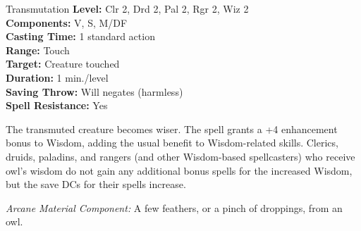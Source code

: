 {Transmutation}
{
	\textbf{Level:}
	Clr 2, Drd 2, Pal 2, Rgr 2, Wiz 2\\
	\textbf{Components:}
	V, S, M/DF\\
	\textbf{Casting Time:}
	1 standard action\\
	\textbf{Range:}
	Touch\\
	\textbf{Target:}
	Creature touched\\
	\textbf{Duration:}
	1 min./level\\
	\textbf{Saving Throw:}
	Will negates (harmless)\\
	\textbf{Spell Resistance:}
	Yes\\
}
{
	The transmuted creature becomes wiser. The spell grants a +4 enhancement bonus to Wisdom, adding the usual benefit to Wisdom-related skills. Clerics, druids, paladins, and rangers (and other Wisdom-based spellcasters) who receive owl's wisdom do not gain any additional bonus spells for the increased Wisdom, but the save DCs for their spells increase.

	\textit{Arcane Material Component:}
	A few feathers, or a pinch of droppings, from an owl.

}
